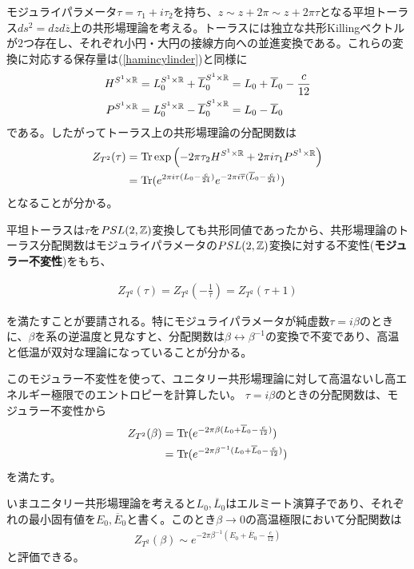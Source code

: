 モジュライパラメータ$\tau=\tau_1+i\tau_2$を持ち、$z\sim z+2\pi \sim z+2\pi\tau$となる平坦トーラス$ds^2=dzd\overline{z}$上の共形場理論を考える。トーラスには独立な共形Killingベクトルが$2$つ存在し、それぞれ小円・大円の接線方向への並進変換である。これらの変換に対応する保存量は(\ref{hamincylinder})と同様に
\begin{align}
H^{S^1\times \mathbb{R}}&=L_0^{S^1\times \mathbb{R}}+\overline{L}_0^{S^1\times \mathbb{R}}=L_0+\overline{L}_0-\frac{c}{12}\label{hamtorus}\\
P^{S^1\times \mathbb{R}}&=L_0^{S^1\times \mathbb{R}}-\overline{L}_0^{S^1\times \mathbb{R}}=L_0-\overline{L}_0\label{momtorus}
\end{align}
である。したがってトーラス上の共形場理論の分配関数は
\begin{align}\label{torusPF}
Z_{T^2}(\tau)&=\text{Tr} \exp\left(-2\pi \tau_2 H^{S^1\times \mathbb{R}}+2\pi i \tau_1 P^{S^1\times \mathbb{R}}\right)\\
&=\text{Tr} (e^{2\pi i \tau (L_0-\frac{c}{24})}e^{-2\pi i \overline{\tau} (\overline{L}_0-\frac{c}{24})})
\end{align}
となることが分かる。


平坦トーラスは$\tau$を$PSL(2,\mathbb{Z})$変換しても共形同値であったから、共形場理論のトーラス分配関数はモジュライパラメータの$PSL(2,\mathbb{Z})$変換に対する不変性(\textbf{モジュラー不変性})をもち、
\begin{oframed}
\begin{align}
Z_{T^2}(\tau)=Z_{T^2}\left(-\frac{1}{\tau}\right)=Z_{T^2}(\tau+1)
\end{align}
\end{oframed}
を満たすことが要請される。特にモジュライパラメータが純虚数$\tau=i\beta$のときに、$\beta$を系の逆温度と見なすと、分配関数は$\beta\leftrightarrow \beta^{-1}$の変換で不変であり、高温と低温が双対な理論になっていることが分かる。


このモジュラー不変性を使って、ユニタリー共形場理論に対して高温ないし高エネルギー極限でのエントロピーを計算したい。
$\tau=i\beta$のときの分配関数は、モジュラー不変性から
\begin{align}
Z_{T^2}(\beta)&=\text{Tr} (e^{-2\pi \beta (L_0+\overline{L}_0-\frac{c}{12})})\\
&=\text{Tr} (e^{-2\pi \beta^{-1} (L_0+\overline{L}_0-\frac{c}{12})})
\end{align}
を満たす。

いまユニタリー共形場理論を考えると$L_0,\overline{L}_0$はエルミート演算子であり、それぞれの最小固有値を$E_0,\overline{E}_0$と書く。このとき$\beta\to 0$の高温極限において分配関数は
\begin{align}
Z_{T^2}(\beta)\sim e^{-2\pi \beta^{-1} (E_0+\overline{E}_0-\frac{c}{12})}
\end{align}
と評価できる。

